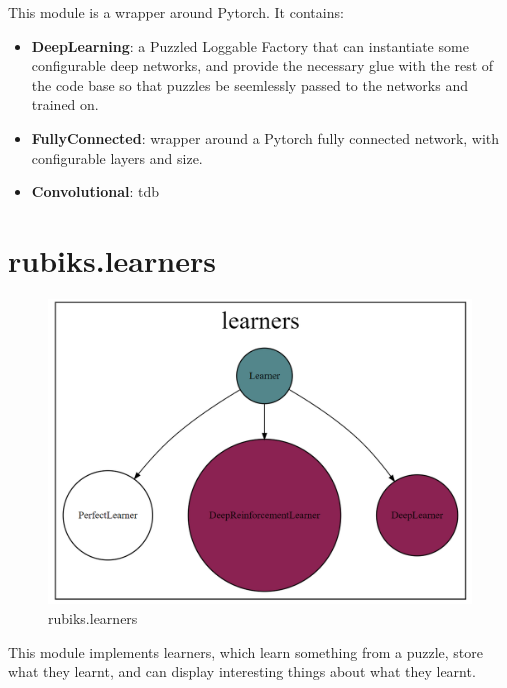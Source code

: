 This module is a wrapper around Pytorch. It contains:
\begin{itemize}
\item \textbf{DeepLearning}: a Puzzled Loggable Factory that can instantiate some configurable deep networks, and provide the necessary glue with the rest of the code base so that puzzles be seemlessly passed to the networks and trained on.
\item \textbf{FullyConnected}: wrapper around a Pytorch fully connected network, with configurable layers and size.
\item \textbf{Convolutional}: tdb
\end{itemize}


\section{rubiks.learners}
\label{sec:codelearners}
\begin{figure}[H]
\centering
\includegraphics[scale=0.25]{./Figures/codebaselearners}
\caption[Codebase]{rubiks.learners}
\label{fig:Codebaselearners}
\end{figure}
\label{PLcode}
\label{DRLcode}
This module implements learners, which learn something from a puzzle, store what they learnt, and can display interesting things about what they learnt.

